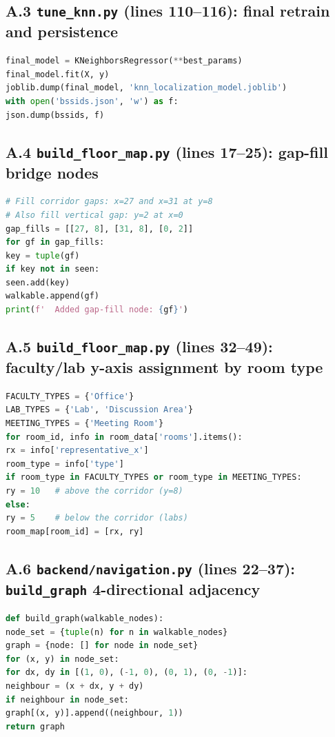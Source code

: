 \documentclass[11pt,a4paper]{article}
\begin{document}
\subsection*{A.3 \texttt{tune\_knn.py} (lines 110--116): final retrain and persistence}
\begin{lstlisting}[language=Python]
final_model = KNeighborsRegressor(**best_params)
final_model.fit(X, y)
joblib.dump(final_model, 'knn_localization_model.joblib')
with open('bssids.json', 'w') as f:
json.dump(bssids, f)
\end{lstlisting}
\subsection*{A.4 \texttt{build\_floor\_map.py} (lines 17--25): gap-fill bridge nodes}
\begin{lstlisting}[language=Python]
# Fill corridor gaps: x=27 and x=31 at y=8
# Also fill vertical gap: y=2 at x=0
gap_fills = [[27, 8], [31, 8], [0, 2]]
for gf in gap_fills:
key = tuple(gf)
if key not in seen:
seen.add(key)
walkable.append(gf)
print(f'  Added gap-fill node: {gf}')
\end{lstlisting}
\subsection*{A.5 \texttt{build\_floor\_map.py} (lines 32--49): faculty/lab y-axis assignment by room type}
\begin{lstlisting}[language=Python]
FACULTY_TYPES = {'Office'}
LAB_TYPES = {'Lab', 'Discussion Area'}
MEETING_TYPES = {'Meeting Room'}
for room_id, info in room_data['rooms'].items():
rx = info['representative_x']
room_type = info['type']
if room_type in FACULTY_TYPES or room_type in MEETING_TYPES:
ry = 10   # above the corridor (y=8)
else:
ry = 5    # below the corridor (labs)
room_map[room_id] = [rx, ry]
\end{lstlisting}
\subsection*{A.6 \texttt{backend/navigation.py} (lines 22--37): \texttt{build\_graph} 4-directional adjacency}
\begin{lstlisting}[language=Python]
def build_graph(walkable_nodes):
node_set = {tuple(n) for n in walkable_nodes}
graph = {node: [] for node in node_set}
for (x, y) in node_set:
for dx, dy in [(1, 0), (-1, 0), (0, 1), (0, -1)]:
neighbour = (x + dx, y + dy)
if neighbour in node_set:
graph[(x, y)].append((neighbour, 1))
return graph
\end{lstlisting}
\end{document}
